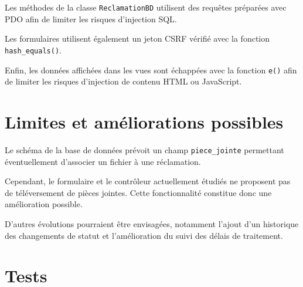 Les méthodes de la classe \texttt{ReclamationBD} utilisent des requêtes préparées avec PDO afin de limiter les risques d'injection SQL.

Les formulaires utilisent également un jeton CSRF vérifié avec la fonction \texttt{hash\_equals()}.

Enfin, les données affichées dans les vues sont échappées avec la fonction \texttt{e()} afin de limiter les risques d'injection de contenu HTML ou JavaScript.

\section{Limites et améliorations possibles}

Le schéma de la base de données prévoit un champ \texttt{piece\_jointe} permettant éventuellement d'associer un fichier à une réclamation.

Cependant, le formulaire et le contrôleur actuellement étudiés ne proposent pas de téléversement de pièces jointes. Cette fonctionnalité constitue donc une amélioration possible.

D'autres évolutions pourraient être envisagées, notamment l'ajout d'un historique des changements de statut et l'amélioration du suivi des délais de traitement.

\section{Tests}

